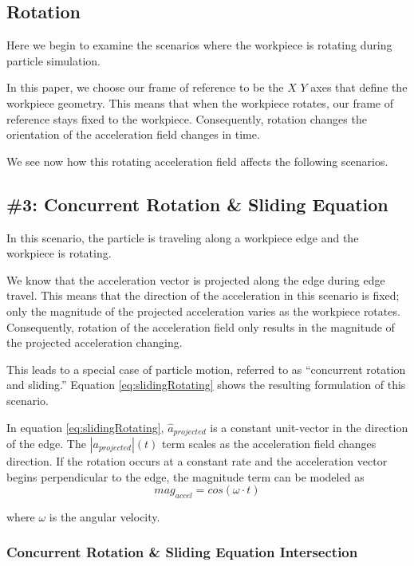 		\subsection{Rotation}

Here we begin to examine the scenarios where the workpiece is rotating during particle simulation.

In this paper, we choose our frame of reference to be the $X$ $Y$ axes that define the workpiece geometry. This means that when the workpiece rotates, our frame of reference stays fixed to the workpiece. Consequently, rotation changes the orientation of the acceleration field changes in time.

We see now how this rotating acceleration field affects the following scenarios.

		\subsection{\#3: Concurrent Rotation \& Sliding Equation}

In this scenario, the particle is traveling along a workpiece edge and the workpiece is rotating.

We know that the acceleration vector is projected along the edge during edge travel. This means that the direction of the acceleration in this scenario is fixed; only the magnitude of the projected acceleration varies as the workpiece rotates. Consequently, rotation of the acceleration field only results in the magnitude of the projected acceleration changing.

This leads to a special case of particle motion, referred to as ``concurrent rotation and sliding.'' Equation \eqref{eq:slidingRotating} shows the resulting formulation of this scenario.

 {
	\label{eq:slidingRotating}
}

In equation \eqref{eq:slidingRotating}, $\hat{a}_{projected}$ is a constant unit-vector in the direction of the edge. The $|a_{projected}|(t)$ term scales as the acceleration field changes direction. If the rotation occurs at a constant rate and the acceleration vector begins perpendicular to the edge, the magnitude term can be modeled as
$$
mag_{accel} = cos(\omega \cdot t)
$$

where $\omega$ is the angular velocity.

		\subsubsection{Concurrent Rotation \& Sliding Equation Intersection}

